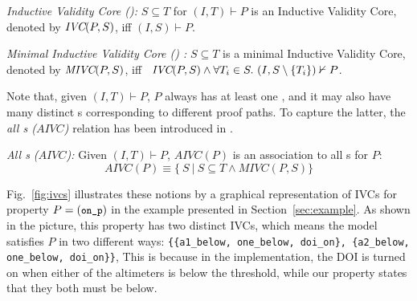\begin{definition}{\emph{Inductive Validity Core (\ivc)\cite{Ghass16}:}}
  \label{def:minimal-ivc}
  $S \subseteq T$ for $(I, T)\vdash P$ is an Inductive Validity Core,
  denoted by $\textit{IVC}(P, S)$, iff $(I, S) \vdash P $.
\end{definition}

\begin{definition}{\emph{Minimal Inductive Validity Core (\mivc) \cite{Ghass16}:}}
  \label{def:minimal-ivc}
  $S \subseteq T$ is a minimal Inductive Validity Core,
  denoted by $\textit{MIVC}(P, S)$, iff ~$\textit{IVC}(P, S) \wedge \forall T_i \in S.~ (I, S\setminus\{ T_i \}) \nvdash P$.
\end{definition}


Note that, given $(I, T) \vdash P$, $P$ always has at least one \mivc, and it may also have many distinct \mivc s corresponding to different proof paths. To capture the latter, the \emph{all \mivc s ($AIVC$)} relation has been introduced in \cite{Ghass16, Murugesan16:renext}.
\begin{definition}{\emph{All \mivc s ($AIVC$)\cite{Murugesan16:renext}:}}
    \label{def:allivcs}
    Given $(I, T) \vdash P$, $AIVC(P)$ is an association to all \mivc s for $P$:
    $$ AIVC(P) \equiv  \{\ S~|~S \subseteq T \land  MIVC(P, S)\} $$
\end{definition}

Fig.~\ref{fig:ivcs} illustrates these notions by a graphical representation of IVCs for property $P = (\small{\texttt{on\_p}})$ in the example presented in Section~\ref{sec:example}. As shown in the picture, this property has two distinct IVCs, which means the model satisfies $P$ in two different ways:  \texttt{\{\{a1\_below, one\_below, doi\_on\}, \{a2\_below, one\_below, doi\_on\}\}}, This is because in the implementation, the DOI is turned on when either of the altimeters is below the threshold, while our property states that they both must be below.


